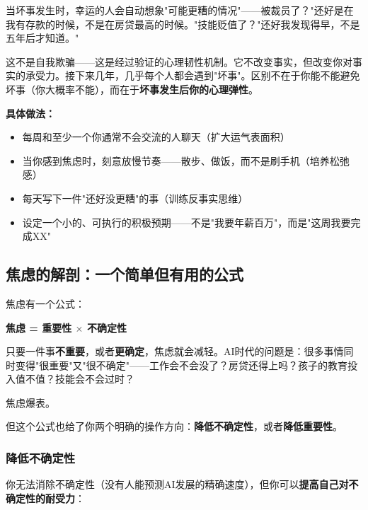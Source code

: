 \documentclass[a4paper,12pt,UTF8]{ctexart}
\begin{document}
当坏事发生时，幸运的人会自动想象"可能更糟的情况"——被裁员了？"还好是在我有存款的时候，不是在房贷最高的时候。"技能贬值了？"还好我发现得早，不是五年后才知道。"

这不是自我欺骗——这是经过验证的心理韧性机制。它不改变事实，但改变你对事实的承受力。接下来几年，几乎每个人都会遇到"坏事"。区别不在于你能不能避免坏事（你大概率不能），而在于\textbf{坏事发生后你的心理弹性}。

\textbf{具体做法：}
\begin{itemize}
\item 每周和至少一个你通常不会交流的人聊天（扩大运气表面积）
\item 当你感到焦虑时，刻意放慢节奏——散步、做饭，而不是刷手机（培养松弛感）
\item 每天写下一件"还好没更糟"的事（训练反事实思维）
\item 设定一个小的、可执行的积极预期——不是"我要年薪百万"，而是"这周我要完成XX"
\end{itemize}

\subsection{焦虑的解剖：一个简单但有用的公式}

焦虑有一个公式：

\begin{center}
\textbf{焦虑 = 重要性 $\times$ 不确定性}
\end{center}

只要一件事\textbf{不重要}，或者\textbf{更确定}，焦虑就会减轻。AI时代的问题是：很多事情同时变得"很重要"又"很不确定"——工作会不会没了？房贷还得上吗？孩子的教育投入值不值？技能会不会过时？

焦虑爆表。

但这个公式也给了你两个明确的操作方向：\textbf{降低不确定性}，或者\textbf{降低重要性}。

\subsubsection{降低不确定性}

你无法消除不确定性（没有人能预测AI发展的精确速度），但你可以\textbf{提高自己对不确定性的耐受力}：
\end{document}
